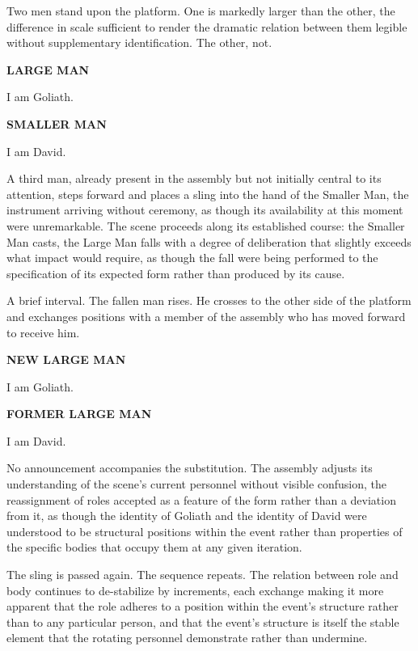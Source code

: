 \documentclass[12pt, oneside]{article}
\newenvironment{action}{%
  \vspace{0.6em}%
  \noindent\ignorespaces%
}{%
  \par\vspace{0.6em}%
}
\newcommand{\character}[1]{%
  \vspace{0.8em}%
  \begin{center}%
    \bfseries\MakeUppercase{#1}%
  \end{center}%
  \vspace{-0.3em}%
}
\newenvironment{dialogue}{%
  \vspace{0.2em}%
  \begin{list}{}{%
    \setlength{\leftmargin}{1.2in}%
    \setlength{\rightmargin}{0.8in}%
    \setlength{\itemsep}{0.6em}%
    \setlength{\parsep}{0pt}%
  }%
}{%
  \end{list}%
  \vspace{0.4em}%
}
\newcommand{\says}[2]{%
  \character{#1}%
  \begin{dialogue}\item #2\end{dialogue}%
}
\begin{document}
\begin{action}
Two men stand upon the platform. One is markedly larger than the other, the difference in scale sufficient to render the dramatic relation between them legible without supplementary identification. The other, not.
\end{action}

\says{Large Man}{I am Goliath.}

\says{Smaller Man}{I am David.}

\begin{action}
A third man, already present in the assembly but not initially central to its attention, steps forward and places a sling into the hand of the Smaller Man, the instrument arriving without ceremony, as though its availability at this moment were unremarkable. The scene proceeds along its established course: the Smaller Man casts, the Large Man falls with a degree of deliberation that slightly exceeds what impact would require, as though the fall were being performed to the specification of its expected form rather than produced by its cause.

A brief interval. The fallen man rises. He crosses to the other side of the platform and exchanges positions with a member of the assembly who has moved forward to receive him.
\end{action}

\says{New Large Man}{I am Goliath.}

\says{Former Large Man}{I am David.}

\begin{action}
No announcement accompanies the substitution. The assembly adjusts its understanding of the scene's current personnel without visible confusion, the reassignment of roles accepted as a feature of the form rather than a deviation from it, as though the identity of Goliath and the identity of David were understood to be structural positions within the event rather than properties of the specific bodies that occupy them at any given iteration.

The sling is passed again. The sequence repeats. The relation between role and body continues to de-stabilize by increments, each exchange making it more apparent that the role adheres to a position within the event's structure rather than to any particular person, and that the event's structure is itself the stable element that the rotating personnel demonstrate rather than undermine.
\end{action}
\end{document}
